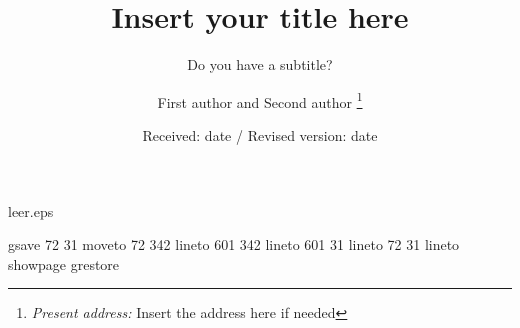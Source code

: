 %
%
%
%
\begin{filecontents}{leer.eps}

gsave
72 31 moveto
72 342 lineto
601 342 lineto
601 31 lineto
72 31 lineto
showpage
grestore
\end{filecontents}
%
\documentclass[stropt,referee]{svjour}
%
\usepackage{graphics}
%

%
\title{Insert your title here}
\subtitle{Do you have a subtitle?} %
\author{First author and Second author%
%
\thanks{\emph{Present address:} Insert the address here if needed}%
}                     %
%
\offprints{}          %
%
%
\date{Received: date / Revised version: date}
%
\maketitle
%
\begin{abstract}
Insert your abstract here.%
%
\end{abstract}
%
\section{Introduction}
\label{intro}
Your text comes here. Separate text sections with
\section{Section title}
\label{sec:1}
and \citet{RefJ}
